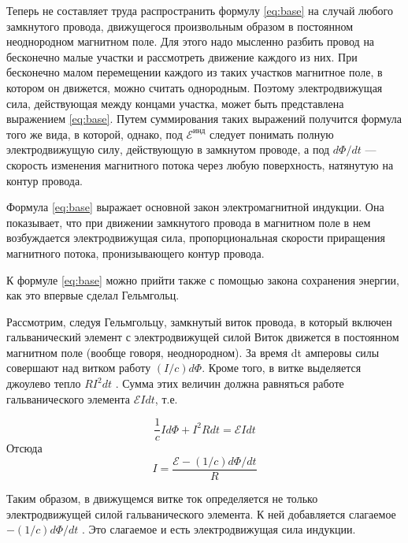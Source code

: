 Теперь не составляет труда
распространить формулу \eqref{eq:base} на случай
любого замкнутого провода, движущегося
произвольным образом в постоянном
неоднородном магнитном поле. Для этого
надо мысленно разбить провод на
бесконечно малые участки и рассмотреть
движение каждого из них. При бесконечно
малом перемещении каждого из таких
участков магнитное поле, в котором он
движется, можно считать однородным.
Поэтому электродвижущая сила,
действующая между концами участка, может
быть представлена выражением
\eqref{eq:base}.
Путем суммирования таких выражений
получится формула того же вида,
в которой, однако, под
$\mathscr{E}^\text{инд}$ следует
понимать полную электродвижущую силу,
действующую в замкнутом проводе, а под
$d\Phi/dt$ --- скорость изменения магнитного
потока через любую поверхность,
натянутую на контур провода.

Формула \eqref{eq:base} выражает основной закон
электромагнитной индукции. Она
показывает, что при движении замкнутого
провода в магнитном поле в нем
возбуждается электродвижущая сила,
пропорциональная скорости приращения
магнитного потока, пронизывающего контур
провода.

К формуле \eqref{eq:base} можно прийти также с
помощью закона сохранения энергии, как
это впервые сделал Гельмгольц.

Рассмотрим, следуя Гельмгольцу,
замкнутый виток провода, в который
включен гальванический элемент с
электродвижущей силой Виток движется в
постоянном магнитном поле (вообще
говоря, неоднородном). За время dt
амперовы силы совершают над витком
работу $(I/c)d\Phi$. Кроме того, в витке
выделяется джоулево тепло $RI^2dt$ . Сумма
этих величин должна равняться работе
гальванического элемента $\mathscr{E} I
dt$, т.е.

\begin{equation}
    \frac{1}{c}Id\Phi + I^2Rdt =
    \mathscr{E}I dt
\end{equation}
Отсюда
\begin{equation}
    I =
    \frac{\mathscr{E}-(1/c)d\Phi/dt}{R}
    \label{eq:helm}
\end{equation}

Таким образом, в движущемся витке ток
определяется не только электродвижущей
силой гальванического элемента. К ней
добавляется слагаемое $-(1/c)d\Phi/dt$ . Это
слагаемое и есть электродвижущая сила
индукции.

